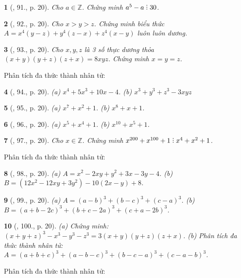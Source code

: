 \documentclass{article}
\newtheorem{baitoan}{}
\DeclareRobustCommand{\divby}{%
	\mathrel{\vbox{\baselineskip.65ex\lineskiplimit0pt\hbox{.}\hbox{.}\hbox{.}}}%
}
\begin{document}
\begin{baitoan}[\cite{Tuyen_Toan_8}, 91., p. 20]
	Cho $a\in\mathbb{Z}$. Chứng minh $a^5 - a\divby30$.
\end{baitoan}

\begin{baitoan}[\cite{Tuyen_Toan_8}, 92., p. 20]
	Cho $x > y > z$. Chứng minh biểu thức $A = x^4(y - z) + y^4(z - x) + z^4(x - y)$ luôn luôn dương.
\end{baitoan}

\begin{baitoan}[\cite{Tuyen_Toan_8}, 93., p. 20]
	Cho $x,y,z$ là 3 số thực dương thỏa $(x + y)(y + z)(z + x) = 8xyz$. Chứng minh $x = y = z$.
\end{baitoan}
Phân tích đa thức thành nhân tử:

\begin{baitoan}[\cite{Tuyen_Toan_8}, 94., p. 20]
	(a) $x^4 + 5x^3 + 10x - 4$. (b) $x^3 + y^3 + z^3 - 3xyz$
\end{baitoan}

\begin{baitoan}[\cite{Tuyen_Toan_8}, 95., p. 20]
	(a) $x^7 + x^2 + 1$. (b) $x^8 + x + 1$.
\end{baitoan}

\begin{baitoan}[\cite{Tuyen_Toan_8}, 96., p. 20]
	(a) $x^5 + x^4 + 1$. (b) $x^{10} + x^5 + 1$.
\end{baitoan}

\begin{baitoan}[\cite{Tuyen_Toan_8}, 97., p. 20]
	Cho $x\in\mathbb{Z}$. Chứng minh $x^{200} + x^{100} + 1\divby x^4 + x^2 + 1$.
\end{baitoan}
Phân tích đa thức thành nhân tử:

\begin{baitoan}[\cite{Tuyen_Toan_8}, 98., p. 20]
	(a) $A = x^2 - 2xy + y^2 + 3x - 3y - 4$. (b) $B = (12x^2 - 12xy + 3y^2) - 10(2x - y) + 8$.
\end{baitoan}

\begin{baitoan}[\cite{Tuyen_Toan_8}, 99., p. 20]
	(a) $A = (a - b)^3 + (b - c)^3 + (c - a)^3$. (b) $B = (a + b - 2c)^3 + (b + c - 2a)^3 + (c + a - 2b)^3$.
\end{baitoan}

\begin{baitoan}[\cite{Tuyen_Toan_8}, 100., p. 20]
	(a) Chứng minh: $(x + y + z)^3 - x^3 - y^3 - z^3 = 3(x + y)(y + z)(z + x)$. (b) Phân tích đa thức thành nhân tử: $A = (a + b + c)^3 + (a - b - c)^3 + (b - c - a)^3 + (c - a - b)^3$.
\end{baitoan}
Phân tích đa thức thành nhân tử:
\end{document}
